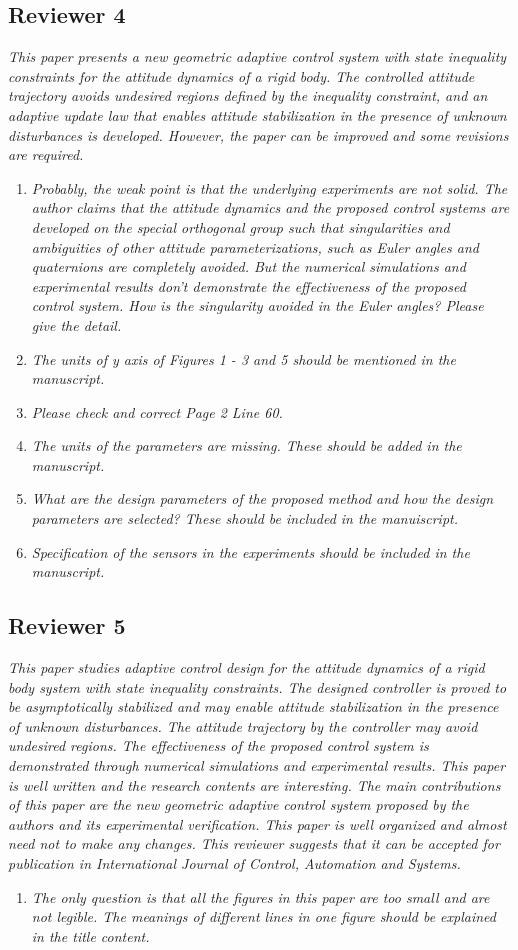 \documentclass[11pt]{article}
\begin{document}
\subsection*{Reviewer 4}
\textit{This paper presents a new geometric adaptive control system with state inequality constraints for the attitude dynamics of a rigid body. The controlled attitude trajectory avoids undesired regions defined by the inequality constraint, and an adaptive update law that enables attitude stabilization in the presence of unknown disturbances is developed. However, the paper can be improved and some revisions are required.}

\begin{enumerate}
\item \textit{Probably, the weak point is that the underlying experiments are not solid. The author claims that the attitude dynamics and the proposed control systems are developed on the special orthogonal group such that singularities and ambiguities of other attitude parameterizations, such as Euler angles and quaternions are completely avoided.  But the numerical simulations and experimental results don't demonstrate the effectiveness of the proposed control system. How is the singularity avoided in the Euler angles? Please give the detail.}
\item \textit{The units of y axis of Figures 1 - 3 and 5 should be mentioned in the manuscript.}
\item \textit{Please check and correct Page 2 Line 60.}
\item \textit{The units of the parameters are missing. These should be added in the manuscript.}
\item \textit{What are the design parameters of the proposed method and how the design parameters are selected? These should be included in the manuiscript.}
\item \textit{Specification of the sensors in the experiments should be included in the manuscript.}
\end{enumerate}

\subsection*{Reviewer 5}
\textit{This paper studies adaptive control design for the attitude dynamics of a rigid body system with state inequality constraints. The designed controller is proved to be asymptotically stabilized and may enable attitude stabilization in the presence of unknown disturbances. The attitude trajectory by the controller may avoid undesired regions. The effectiveness of the proposed control system is demonstrated through numerical simulations and experimental results. This paper is well written and the research contents are interesting. The main contributions of this paper are the new geometric adaptive control system proposed by the authors and its experimental verification. This paper is well organized and almost need not to make any changes. This reviewer suggests that it can be accepted for publication in International Journal of Control, Automation and Systems.}

\begin{enumerate}
\item \textit{The only question is that all the figures in this paper are too small and are not legible. The meanings of different lines in one figure should be explained in the title content.}
\end{enumerate}



\end{document}
